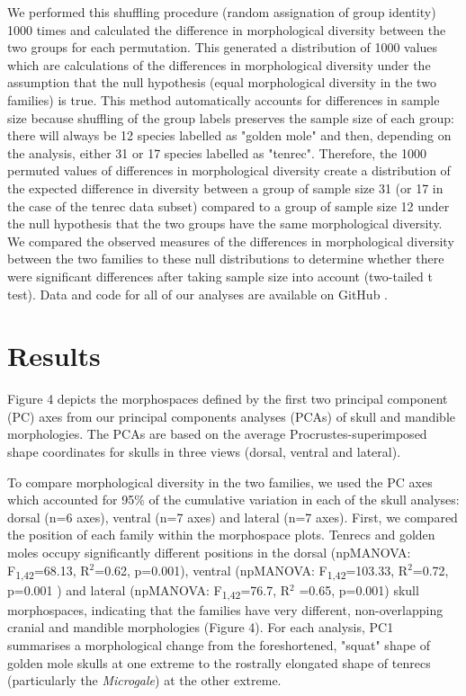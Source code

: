 \documentclass[12pt,a4paper]{article}
\begin{document}
	We performed this shuffling procedure (random assignation of group identity) 1000 times and calculated the difference in morphological diversity between the two groups for each permutation. This generated a distribution of 1000 values which are calculations of the differences in morphological diversity under the assumption that the null hypothesis (equal morphological diversity in the two families) is true. This method automatically accounts for differences in sample size because shuffling of the group labels preserves the sample size of each group: there will always be 12 species labelled as "golden mole" and then, depending on the analysis, either 31 or 17 species labelled as "tenrec". Therefore, the 1000 permuted values of differences in morphological diversity create a distribution of the expected difference in diversity between a group of sample size 31 (or 17 in the case of the tenrec data subset) compared to a group of sample size 12 under the null hypothesis that the two groups have the same morphological diversity. We compared the observed measures of the differences in morphological diversity between the two families to these null distributions to determine whether there were significant differences after taking sample size into account (two-tailed t test). Data and code for all of our analyses are available on GitHub \citep{Finlay2015c}.

\section{Results} 
	Figure 4 depicts the morphospaces defined by the first two principal component (PC) axes from our principal components analyses (PCAs) of skull and mandible morphologies. The PCAs are based on the average Procrustes-superimposed shape coordinates for skulls in three views (dorsal, ventral and lateral).

	To compare morphological diversity in the two families, we used the PC axes which accounted for 95\% of the cumulative variation in each of the skull analyses: dorsal (n=6 axes), ventral (n=7 axes) and lateral (n=7 axes). First, we compared the position of each family within the morphospace plots. Tenrecs and golden moles occupy significantly different positions in the dorsal (npMANOVA: F\textsubscript{1,42}=68.13, R$^2$=0.62, p=0.001), ventral (npMANOVA: F\textsubscript{1,42}=103.33, R$^2$=0.72, p=0.001 ) and lateral (npMANOVA: F\textsubscript{1,42}=76.7, R$^2$ =0.65, p=0.001) skull morphospaces, indicating that the families have very different, non-overlapping cranial and mandible morphologies (Figure 4). For each analysis, PC1 summarises a morphological change from the foreshortened, "squat" shape of golden mole skulls at one extreme to the rostrally elongated shape of tenrecs (particularly the \textit{Microgale}) at the other extreme. 
	
\end{document}
